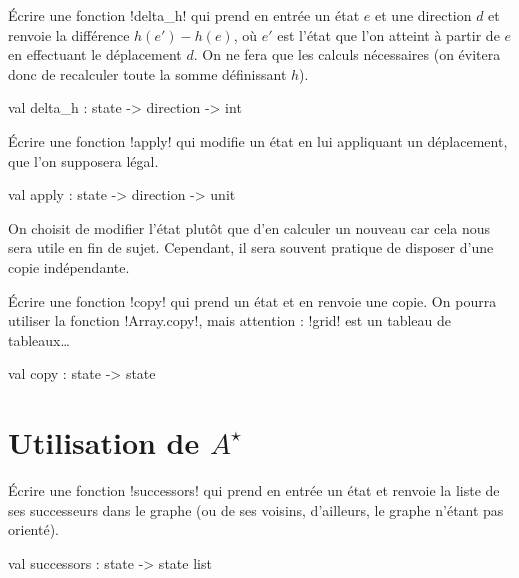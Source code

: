 \begin{ques}
  Écrire une fonction \ml!delta_h! qui prend en entrée un état $e$ et une
  direction $d$ et renvoie la différence $h(e') - h(e)$, où $e'$
  est l'état que l'on atteint à partir de $e$ en effectuant le déplacement
  $d$. On ne fera que les calculs nécessaires (on évitera donc de recalculer
  toute la somme définissant $h$).
\begin{ocaml}
val delta_h : state -> direction -> int
\end{ocaml}
\end{ques}

\begin{ques}
  Écrire une fonction \ml!apply! qui modifie un état en lui appliquant
  un déplacement, que l'on supposera légal.
\begin{ocaml}
val apply : state -> direction -> unit
\end{ocaml}
\end{ques}\medskip

On choisit de modifier l'état plutôt que d'en calculer un nouveau car cela
nous sera utile en fin de sujet. Cependant, il sera souvent pratique
de disposer d'une copie indépendante.


\begin{ques}
  Écrire une fonction \ml!copy! qui prend un état et en renvoie une copie.
  On pourra utiliser la fonction \ml!Array.copy!, mais attention : \ml!grid!
  est un tableau de tableaux\dots
\begin{ocaml}
val copy : state -> state
\end{ocaml}
\end{ques}


\section{Utilisation de $A^{\star}$}



\begin{ques}
  Écrire une fonction \ml!successors! qui prend en entrée un état et renvoie
  la liste de ses successeurs dans le graphe (ou de ses voisins, d'ailleurs,
  le graphe n'étant pas orienté).
\begin{ocaml}
val successors : state -> state list
\end{ocaml}
\end{ques}

